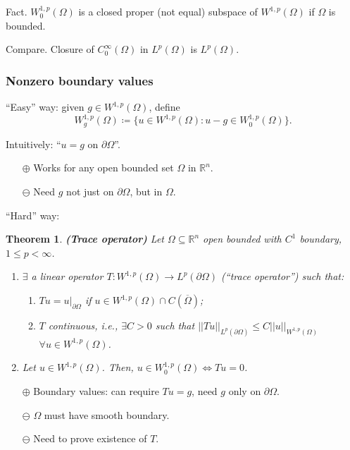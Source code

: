 \documentclass[12pt]{article}
\newtheorem{theorem}{Theorem}[section]
\theoremstyle{definition}
\begin{document}
Fact. $W_0^{1,p}(\Omega)$ is a closed proper (not equal) subspace of $W^{1,p}(\Omega)$ if $\Omega$ is bounded.

Compare. Closure of $C_0^{\infty}(\Omega)$ in $L^p(\Omega)$ is $L^p(\Omega)$.

\subsubsection{Nonzero boundary values}
``Easy'' way: given $g\in W^{1,p}(\Omega)$, define
\[W_g^{1,p}(\Omega)\coloneqq\{u\in W^{1,p}(\Omega):u-g\in W_0^{1,p}(\Omega)\}.\]

Intuitively: ``$u=g$ on $\partial\Omega$''.

\begin{itemize}
\item[$\boldsymbol{\oplus}$] Works for any open bounded set $\Omega$ in $\mathbb{R}^n$.

\item[$\boldsymbol{\ominus}$] Need $g$ not just on $\partial\Omega$, but in $\Omega$.
\end{itemize}

``Hard'' way:
\begin{theorem}\label{trace_operator}
\emph{\textbf{(Trace operator)}} Let $\Omega\subseteq\mathbb{R}^n$ open bounded with $C^1$ boundary, $1\leq p<\infty$.

\begin{enumerate}[label=\alph*)]
\item $\exists$ a linear operator $T:W^{1,p}(\Omega)\rightarrow L^p(\partial\Omega)$ (``trace operator'') such that:
\begin{enumerate}[label=\roman*)]
\item $Tu=u|_{\partial\Omega}$ if $u\in W^{1,p}(\Omega)\cap C(\overline{\Omega})$;
\item $T$ continuous, i.e., $\exists C>0$ such that $||Tu||_{L^p(\partial\Omega)}\leq C||u||_{W^{1,p}(\Omega)}$ $\forall u\in W^{1,p}(\Omega)$.
\end{enumerate}

\item Let $u\in W^{1,p}(\Omega)$. Then, $u\in W_0^{1,p}(\Omega)\Longleftrightarrow Tu=0$.
\end{enumerate}
\end{theorem}

\begin{itemize}
\item[$\boldsymbol{\oplus}$] Boundary values: can require $Tu=g$, need $g$ only on $\partial\Omega$.

\item[$\boldsymbol{\ominus}$] $\Omega$ must have smooth boundary.

\item[$\boldsymbol{\ominus}$] Need to prove existence of $T$.
\end{itemize}
\end{document}
